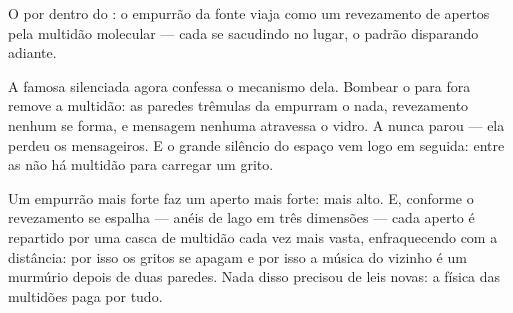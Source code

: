 \begin{omfigure}

{\small O  por dentro do : o empurrão da fonte viaja como um
revezamento de apertos pela multidão molecular --- cada  se
sacudindo no lugar, o padrão disparando adiante.}
\end{omfigure}

\begin{example}\label{ex:g7:sound-production:jar}
A famosa  silenciada agora confessa o mecanismo dela.
Bombear o  para fora remove a multidão: as paredes trêmulas da
 empurram o nada, revezamento nenhum se forma, e mensagem
nenhuma atravessa o vidro. A  nunca parou --- ela perdeu os
mensageiros. E o grande silêncio do espaço vem logo em seguida: entre
as  não há multidão para carregar um grito.
\end{example}

\begin{example}\label{ex:g7:sound-production:loud}
Um empurrão mais forte faz um aperto mais forte:  mais alto. E,
conforme o revezamento se espalha --- anéis de lago em três dimensões
--- cada aperto é repartido por uma casca de multidão cada vez mais
vasta, enfraquecendo com a distância: por isso os gritos se apagam e
por isso a música do vizinho é um murmúrio depois de duas paredes.
Nada disso precisou de leis novas: a física das multidões paga por
tudo.
\end{example}

